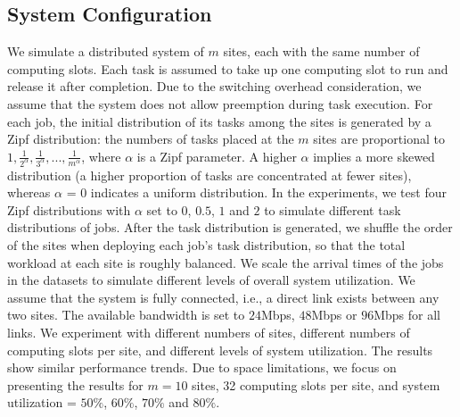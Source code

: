 \subsection{System Configuration}
We simulate a distributed system of $m$ sites, each with the same number of computing slots. Each task is assumed to take up one computing slot to run and release it after completion. Due to the switching overhead consideration, we assume that the system does not allow preemption during task execution. For each job, the initial distribution of its tasks among the sites is generated by a Zipf distribution: the numbers of tasks placed at the $m$ sites are proportional to $1, \frac{1}{2^\alpha}, \frac{1}{3^\alpha}, ..., \frac{1}{m^\alpha}$, where $\alpha$ is a Zipf parameter. A higher $\alpha$ implies a more skewed distribution (a higher proportion of tasks are concentrated at fewer sites), whereas $\alpha$ = $0$ indicates a uniform distribution. In the experiments, we test four Zipf distributions with $\alpha$ set to $0$, $0.5$, $1$ and $2$ to simulate different task distributions of jobs. After the task distribution is generated, we shuffle the order of the sites when deploying each job's task distribution, so that the total workload at each site 
is roughly balanced. 
We scale the arrival times of the jobs in the datasets to simulate different levels of overall system utilization. We assume that the system is fully connected, i.e., a direct link exists between any two sites. The available bandwidth is set to $24$Mbps, $48$Mbps or $96$Mbps for all links. We experiment with different numbers of sites, different numbers of computing slots per site, and different levels of system utilization. The results show similar performance trends. Due to space limitations, we focus on presenting the results for $m=10$ sites, 32 computing slots per site, and system utilization = $50\%$, $60\%$, $70\%$ and $80\%$.  

